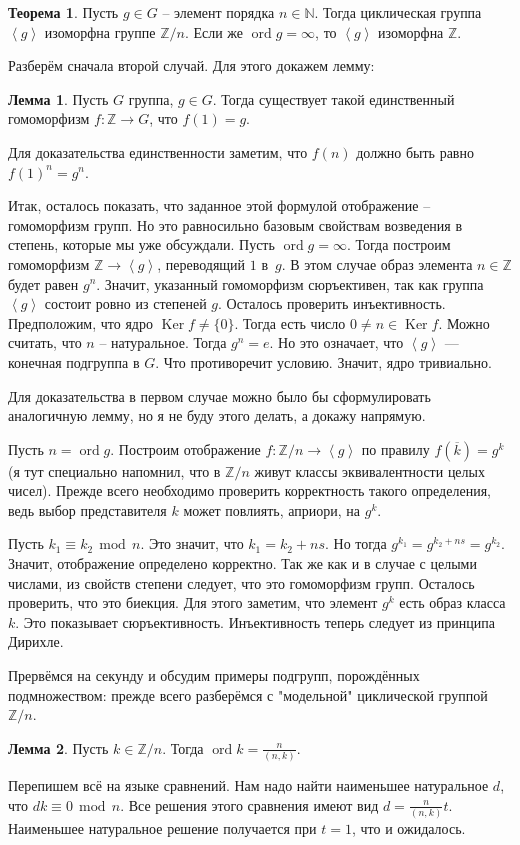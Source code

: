 \documentclass[10pt,a4paper,oneside]{book}
\theoremstyle{definition}
\newtheorem{thm}{\color{red!40!black}Теорема}
\newtheorem{lem}{\color{green!50!black}Лемма}
\renewcommand{\mod}{\,\operatorname{mod}\,}
\newcommand{\mb}[1]{\mathbb{#1}}
\newcommand{\ovl}{\overline}
\DeclareMathOperator{\Ker}{Ker}
\newcommand{\ord}{\operatorname{ord}}
\def\lan{\left\langle }
\def\ran{\right\rangle}
\def\thrm{\begin{thm}}
\def\ethrm{\end{thm}}
\def\lm{\begin{lem}}
\def\elm{\end{lem}}
\begin{document}
\thrm Пусть $g\in G$ -- элемент порядка $n\in \mb N$. Тогда циклическая группа $\lan g \ran $ изоморфна группе $\mb Z/n$. Если же $\ord g = \infty$, то $\lan g \ran$ изоморфна $\mb Z$.
\ethrm
{} Разберём сначала второй случай. Для этого докажем лемму: 
\lm Пусть $G$ группа, $g\in G$. Тогда существует такой единственный гомоморфизм $f \colon \mb Z \to G$, что $f(1)=g$.
\elm
\proof Для доказательства единственности заметим, что $f(n)$ должно быть равно $f(1)^n=g^n$. 

Итак, осталось показать, что заданное этой формулой отображение --  гомоморфизм групп. Но это равносильно базовым свойствам возведения в степень, которые мы уже обсуждали.
\endproof
{}
Пусть $\ord g=\infty$. Тогда построим гомоморфизм $\mb Z \to \lan g \ran$, переводящий $1$ в~$g$. В этом случае образ элемента $n \in \mb Z$ будет равен $g^n$. Значит, указанный гомоморфизм сюръективен, так как группа $\lan g \ran$ состоит ровно из степеней $g$. Осталось проверить инъективность. Предположим, что ядро $\Ker f \neq \{0\}$. Тогда есть число $0\neq n \in\Ker f $. Можно считать, что $n$ -- натуральное. Тогда $g^n=e$. Но это означает, что $\lan g \ran$ --- конечная подгруппа в $G$. Что противоречит условию. Значит, ядро тривиально.


Для доказательства в первом случае можно было бы сформулировать аналогичную лемму, но я не буду этого делать, а докажу напрямую.

Пусть $n=\ord g$. Построим отображение $f \colon\mb Z/n \to \lan g\ran $ по правилу $f(\ovl{k})=g^k$ (я тут специально напомнил, что в $\mb Z/n$ живут классы эквивалентности целых чисел).  Прежде всего необходимо проверить корректность такого определения, ведь выбор представителя $k$ может повлиять, априори, на $g^k$. 

Пусть $k_1\equiv k_2 \mod n$. Это значит, что $k_1=k_2+ns$. Но тогда $g^{k_1}=g^{k_2+ns}=g^{k_2}$. Значит, отображение определено корректно. Так же как и в случае с целыми числами, из свойств степени следует, что это гомоморфизм групп.   Осталось проверить, что это биекция. Для этого заметим, что элемент $g^k$ есть образ класса $k$. Это показывает сюръективность. Инъективность теперь следует из принципа Дирихле.
\endproof

Прервёмся на секунду и обсудим примеры подгрупп, порождённых подмножеством: прежде всего разберёмся с "модельной" циклической группой $\mb Z/n$.

\lm Пусть $k\in \mb Z/n$. Тогда $\ord k = \frac{n}{(n,k)}$. 
\elm
\proof Перепишем всё на языке сравнений. Нам надо найти наименьшее натуральное $d$, что $dk\equiv 0 \mod n$. Все решения этого сравнения имеют вид $d=\frac{n}{(n,k)}t$. Наименьшее натуральное решение получается при $t=1$, что и ожидалось.
\endproof
\end{document}
